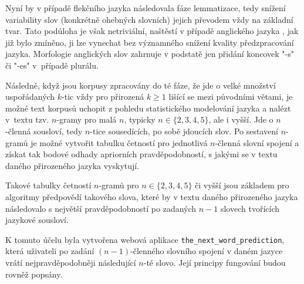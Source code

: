 Nyní by v případě flekčního jazyka následovala fáze
lemmatizace, tedy snížení
variability slov (konkrétně ohebných slovních) jejich převodem vždy na základní
tvar. Tato podúloha je však netriviální, naštěstí v případě anglického jazyka%
,
jak již bylo zmíněno, ji lze vynechat bez významného snížení kvality
předzpracování jazyka. Morfologie anglických slov zahrnuje
v podstatě jen
přidání koncovek "-s" či "-es" v~případě plurálu.

Následně, když jsou korpusy zpracovány do té fáze, že jde o velké
množství uspořádaných $k$-tic vždy pro přirozená $k \geq 1$ lišící se
mezi původními větami, je možné text korpusů uchopit z pohledu
statistického modelování jazyka a nalézt v~textu tzv. $n$-gramy
pro malá
$n$, typicky $n \in \{2, 3, 4, 5\}$, ale i vyšší.
Jde o $n$-členná sousloví, tedy $n$-tice sousedících, po sobě
jdoucích slov\cite{Manning1999}. Po sestavení $n$-gramů je možné vytvořit
tabulku četností pro jednotlivá $n$-členná slovní spojení a získat tak bodové
odhady apriorních pravděpodobností, s jakými se v textu daného
přirozeného jazyka vyskytují.

Takové tabulky četností
$n$-gramů pro $n \in \{2, 3, 4, 5\}$ či vyšší
jsou základem pro algoritmy předpovědí takového slova, které by v textu
daného přirozeného jazyka následovalo s největší pravděpodobností po
zadaných $n - 1$ slovech tvořících jazykové sousloví.

K tomuto účelu byla vytvořena webová aplikace
\texttt{the\_next\_word\_prediction},
která uživateli po zadání
$(n - 1)$-členného slovního spojení v daném jazyce vrátí
nejpravděpodobněji následující $n$-té slovo. Její
principy fungování budou rovněž popsány.


\newpage







